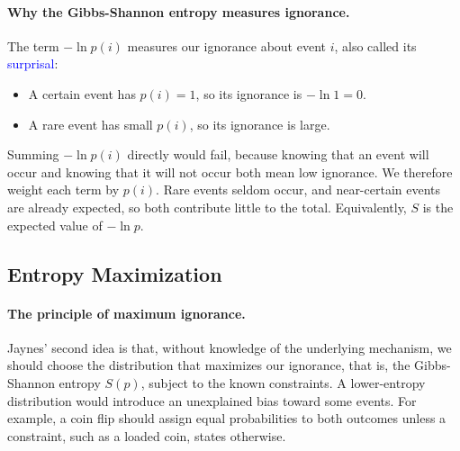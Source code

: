 \paragraph{Why the Gibbs-Shannon entropy measures ignorance.}
The term $-\ln p(i)$ measures our ignorance about event $i$, also called its
\textcolor{blue}{surprisal}:
\begin{itemize}
    \item A certain event has $p(i)=1$, so its ignorance is $-\ln 1 = 0$.
    \item A rare event has small $p(i)$, so its ignorance is large.
\end{itemize}
Summing $-\ln p(i)$ directly would fail, because knowing that an event will
occur and knowing that it will not occur both mean low ignorance. We
therefore weight each term by $p(i)$. Rare events seldom occur, and
near-certain events are already expected, so both contribute little to the
total. Equivalently, $S$ is the expected value of $-\ln p$.

\subsection{Entropy Maximization}

\paragraph{The principle of maximum ignorance.}
Jaynes' second idea is that, without knowledge of the underlying mechanism,
we should choose the distribution that maximizes our ignorance, that is, the
Gibbs-Shannon entropy $S(p)$, subject to the known constraints. A
lower-entropy distribution would introduce an unexplained bias toward some
events. For example, a coin flip should assign equal probabilities to both
outcomes unless a constraint, such as a loaded coin, states otherwise.

